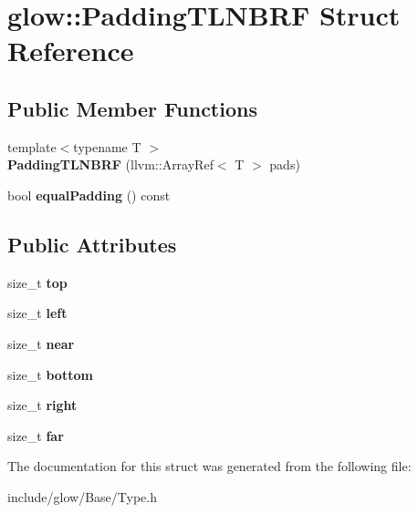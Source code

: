 \hypertarget{structglow_1_1_padding_t_l_n_b_r_f}{}\section{glow\+:\+:Padding\+T\+L\+N\+B\+RF Struct Reference}
\label{structglow_1_1_padding_t_l_n_b_r_f}
\subsection*{Public Member Functions}
\begin{DoxyCompactItemize}
\item 
\mbox{\label{structglow_1_1_padding_t_l_n_b_r_f_ac7d5bda2c7f57dbd4e3ea7013a3c29f3}} 
{\footnotesize template$<$typename T $>$ }\\{\bfseries Padding\+T\+L\+N\+B\+RF} (llvm\+::\+Array\+Ref$<$ T $>$ pads)
\item 
\mbox{\label{structglow_1_1_padding_t_l_n_b_r_f_a8113cc1a955b5070dfea4710f4fe5a09}} 
bool {\bfseries equal\+Padding} () const
\end{DoxyCompactItemize}
\subsection*{Public Attributes}
\begin{DoxyCompactItemize}
\item 
\mbox{\label{structglow_1_1_padding_t_l_n_b_r_f_a7345eedff539e5630d82967f43301a10}} 
size\+\_\+t {\bfseries top}
\item 
\mbox{\label{structglow_1_1_padding_t_l_n_b_r_f_a975214e807e129f68343f381ab0f34f1}} 
size\+\_\+t {\bfseries left}
\item 
\mbox{\label{structglow_1_1_padding_t_l_n_b_r_f_a3fcce0e766448fa07f41b81779c15e4a}} 
size\+\_\+t {\bfseries near}
\item 
\mbox{\label{structglow_1_1_padding_t_l_n_b_r_f_a0c2320498b8a043f556277d11a32e338}} 
size\+\_\+t {\bfseries bottom}
\item 
\mbox{\label{structglow_1_1_padding_t_l_n_b_r_f_a85e137a5e0cc46db7932013f2cc7bd51}} 
size\+\_\+t {\bfseries right}
\item 
\mbox{\label{structglow_1_1_padding_t_l_n_b_r_f_aa8432040c451d255fa257dbd952118c0}} 
size\+\_\+t {\bfseries far}
\end{DoxyCompactItemize}


The documentation for this struct was generated from the following file\+:\begin{DoxyCompactItemize}
\item 
include/glow/\+Base/Type.\+h\end{DoxyCompactItemize}
